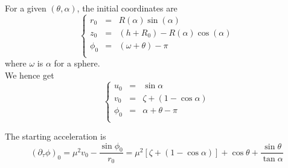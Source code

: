 \documentclass[aps,onecolumn]{revtex4}
\begin{document}
For a given $(\theta,\alpha)$, the initial coordinates are
\begin{equation}
\left\lbrace
\begin{array}{rcl}
	r_0    & = & R(\alpha) \sin(\alpha)\\
	z_0    & = & (h + R_0) - R(\alpha) \cos(\alpha)\\
	\phi_0 & = & \left(\omega + \theta\right) - \pi\\
\end{array}
\right. 
\end{equation}
where $\omega$ is $\alpha$ for a sphere.\\
We hence get
\begin{equation}
\left\lbrace
\begin{array}{rcl}
	u_0    & = & \sin\alpha\\
	v_0    & = & \zeta + (1-\cos\alpha)\\
	\phi_0 & = & \alpha+\theta-\pi\\
\end{array}
\right.
\end{equation}

The starting acceleration is
\begin{equation}
	\left(\partial_\tau \phi\right)_0 = \mu^2 v_0 - \dfrac{\sin\phi_0}{r_0} =
	\mu^2\left\lbrack \zeta + (1-\cos\alpha)\right\rbrack + \cos\theta + \dfrac{\sin\theta}{\tan\alpha}
\end{equation}


%
%
%
\end{document}
